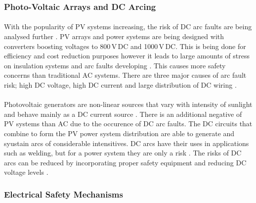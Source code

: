 \subsubsection{Photo-Voltaic Arrays and DC Arcing}

\paragraph{}
With the popularity of PV systems increasing, the risk of DC arc faults are being analysed further \cite{Spooner2008}. PV arrays and power systems are being designed with converters boosting voltages to 800\,V\,DC and 1000\,V\,DC. This is being done for efficiency and cost reduction purposes however it leads to large amounts of stress on insulation systems and arc faults developing \cite{Spooner2008}. This causes more safety concerns than traditional AC systems. There are three major causes of arc fault risk; high DC voltage, high DC current and large distribution of DC wiring \cite{website:DC-Arching}.

\paragraph{}
Photovoltaic generators are non-linear sources that vary with intensity of sunlight and behave mainly as a DC current source \cite{Ribeiro2009}. There is an additional negative of PV systems than AC due to the occurence of DC arc faults. The DC circuits that combine to form the PV power system distribution are able to generate and syustain arcs of considerable intensitives. DC arcs have their uses in applications such as welding, but for a power system they are only a risk \cite{Ribeiro2009}. The risks of DC arcs can be reduced by incorporating proper safety equipment and reducing DC voltage levels \cite{Ribeiro2009}.        

\subsubsection{Electrical Safety Mechanisms}


